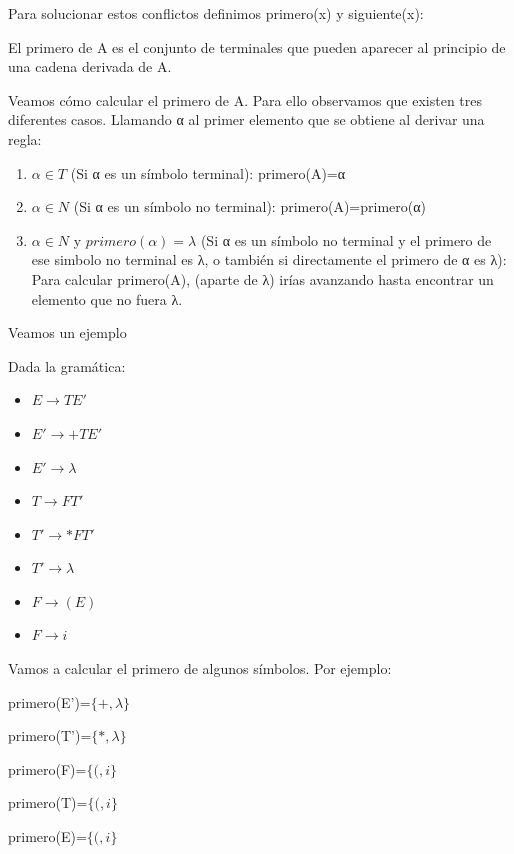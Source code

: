 \documentclass{apuntes}
\begin{document}
Para solucionar estos conflictos definimos primero(x) y siguiente(x):

\begin{defn}[Primero(A)]
El primero de A es el conjunto de terminales que pueden aparecer al principio de una cadena derivada de A.
\end{defn}

Veamos cómo calcular el primero de A. Para ello observamos que existen tres diferentes casos. Llamando α al primer elemento que se obtiene al derivar una regla:
\begin{enumerate}
\item $α \in T$ (Si α es un símbolo terminal):  primero(A)=α
\item $α \in N$ (Si α es un símbolo no terminal): primero(A)=primero(α)
\item $α \in N$ y $primero(α)=λ$ (Si α es un símbolo no terminal y el primero de ese simbolo no terminal es λ, o también si directamente el primero de α es λ): Para calcular primero(A), (aparte de λ) irías avanzando hasta encontrar un elemento que no fuera λ.

\end{enumerate}

Veamos un ejemplo
\begin{example}
Dada la gramática:
\begin{itemize}
\item $E \rightarrow TE'$
\item $E' \to +TE'$
\item $E' \to λ$
\item $T \to FT'$
\item $T' \to *FT'$
\item $T' \to λ$
\item $F \to (E)$
\item $F \to i$
\end{itemize}

Vamos a calcular el primero de algunos símbolos. Por ejemplo:

primero(E')=$\{+, λ\}$

primero(T')=$\{*, λ\}$

primero(F)=$\{(, i\}$

primero(T)=$\{(, i\}$

primero(E)=$\{(, i\}$
\end{example}
\end{document}
